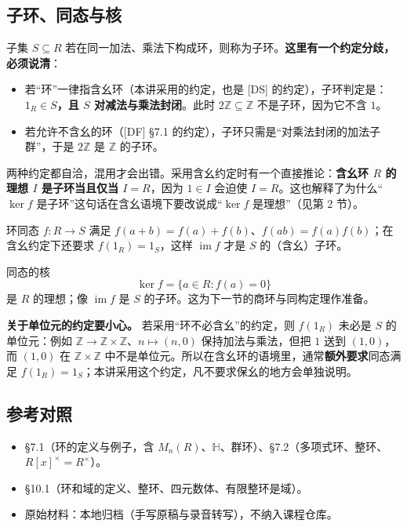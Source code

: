 \subsection{子环、同态与核}


子集 $S\subseteq R$ 若在同一加法、乘法下构成环，则称为子环。\textbf{这里有一个约定分歧，必须说清}：

\begin{itemize}
\item 若“环”一律指含幺环（本讲采用的约定，也是 [DS] 的约定），子环判定是：\textbf{$1_R\in S$，且 $S$ 对减法与乘法封闭}。此时 $2\mathbb Z\subseteq\mathbb Z$ 不是子环，因为它不含 $1$。
\item 若允许不含幺的环（[DF] §7.1 的约定），子环只需是“对乘法封闭的加法子群”，于是 $2\mathbb Z$ 是 $\mathbb Z$ 的子环。
\end{itemize}


两种约定都自洽，混用才会出错。采用含幺约定时有一个直接推论：\textbf{含幺环 $R$ 的理想 $I$ 是子环当且仅当 $I=R$}，因为 $1\in I$ 会迫使 $I=R$。这也解释了为什么“$\ker f$ 是子环”这句话在含幺语境下要改说成“$\ker f$ 是理想”（见第 2 节）。

环同态 $f:R\to S$ 满足 $f(a+b)=f(a)+f(b)$、$f(ab)=f(a)f(b)$；在含幺约定下还要求 $f(1_R)=1_S$，这样 $\operatorname{im}f$ 才是 $S$ 的（含幺）子环。

同态的核
\[\ker f=\{a\in R:f(a)=0\}\]
是 $R$ 的理想；像 $\operatorname{im}f$ 是 $S$ 的子环。这为下一节的商环与同构定理作准备。

\textbf{关于单位元的约定要小心。} 若采用“环不必含幺”的约定，则 $f(1_R)$ 未必是 $S$ 的单位元：例如 $\mathbb Z\to\mathbb Z\times\mathbb Z$、$n\mapsto(n,0)$ 保持加法与乘法，但把 $1$ 送到 $(1,0)$，而 $(1,0)$ 在 $\mathbb Z\times\mathbb Z$ 中不是单位元。所以在含幺环的语境里，通常\textbf{额外要求}同态满足 $f(1_R)=1_S$；本讲采用这个约定，凡不要求保幺的地方会单独说明。

\subsection{参考对照}


\begin{itemize}
\item [DF] §7.1（环的定义与例子，含 $M_n(R)$、$\mathbb H$、群环）、§7.2（多项式环、整环、$R[x]^\times=R^\times$）。
\item [DS] §10.1（环和域的定义、整环、四元数体、有限整环是域）。
\item 原始材料：本地归档（手写原稿与录音转写），不纳入课程仓库。
\end{itemize}
